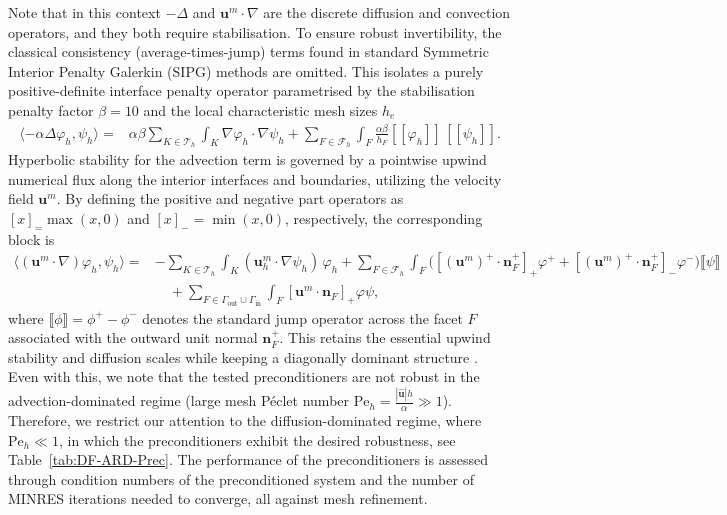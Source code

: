 \documentclass[11pt, reqno, a4paper, twoside]{article}
\newcommand{\bn}{\boldsymbol{n}}
\newcommand{\bu}{\boldsymbol{u}}
\newcommand{\cT}{\mathcal{T}}
\numberwithin{equation}{section}
\numberwithin{remark}{section}
\numberwithin{figure}{section}
\numberwithin{table}{section}
\begin{document}
Note that in this context $-\Delta$ and  $ \bu^m\cdot\nabla$
are  the discrete diffusion and convection operators, and they both  require stabilisation. {To ensure robust invertibility, the classical consistency (average-times-jump) terms found in standard Symmetric Interior Penalty Galerkin (SIPG) methods \cite{arnold2002unified} are  omitted. This isolates a purely positive-definite interface penalty operator parametrised by the stabilisation penalty factor $\beta = 10$ and the local characteristic mesh sizes $h_e$ 
\begin{align*}
    \langle-\alpha\Delta\varphi_h,\psi_h\rangle=& \alpha\beta \sum_{K\in \cT_h} \int_K  \nabla \varphi_h \cdot \nabla \psi_h + \sum_{F\in \mathcal{F}_h}{\int_F} \frac{\alpha\beta}{h_F} [\![\varphi_h]\!]\,[\![\psi_h]\!]. 
\end{align*}
Hyperbolic stability for the advection term is governed by a pointwise upwind numerical flux along the interior interfaces   and boundaries, utilizing the velocity field $\bu^m$. By defining the positive and negative part operators as $[x]_ = \max(x, 0)$ and $[x]_- = \min(x, 0)$, respectively, the corresponding block is 
\begin{align*} 
 \langle(\bu^m\cdot\nabla)\varphi_h,\psi_h \rangle  =& 
-\sum_{K\in \cT_h} \int_K (\bu_h^m\cdot \nabla \psi_h)\,\varphi_h 
+ \sum_{F\in \mathcal{F}_h} \int_F 
\bigl([(\bu^m)^+ \cdot \bn_F^+]_+ \varphi^+ + [(\bu^m)^+ \cdot \bn_F^+]_- \varphi^- \bigr) \llbracket \psi \rrbracket   \\
&\quad  + \sum_{F\in \Gamma_{\text{out}}\cup \Gamma_{\text{in}}}  \int_F [\bu^m \cdot \bn_F]_+ \varphi \psi, 
\end{align*}
where  $\llbracket \phi \rrbracket = \phi^+ - \phi^-$ denotes the standard jump operator across the facet $F$ associated with the outward unit normal $\bn_F^+$. This   retains the essential upwind stability and diffusion scales while keeping a diagonally dominant structure   \cite{franca1992stabilized,kanschat2008multigrid}.
Even with this, we note}  that the tested preconditioners are not robust in the advection-dominated regime (large mesh Péclet number $\mathrm{Pe}_h = \frac{|\hat{\mathbf{u}}|h}{\alpha} \gg 1$). Therefore, we restrict our attention to the diffusion-dominated regime, where $\mathrm{Pe}_h \ll 1$, in which the preconditioners exhibit the desired robustness, see Table~\ref{tab:DF-ARD-Prec}.  The  performance of the preconditioners is assessed through condition numbers of the preconditioned system and the number of MINRES iterations needed to converge, all against  mesh refinement. 
\end{document}
